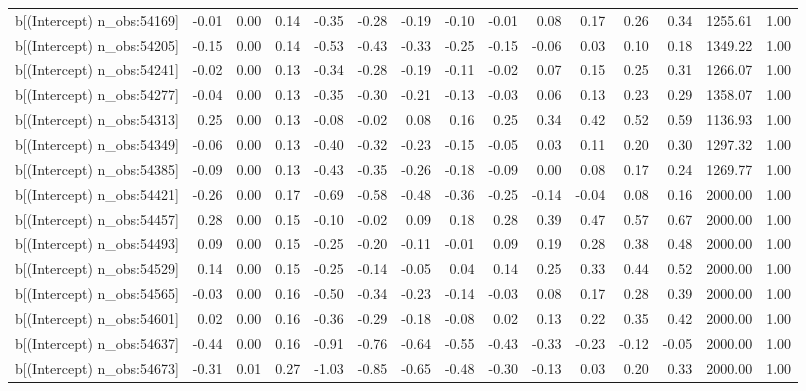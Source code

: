 \begin{table}[ht]
\begin{tabular}{rrrrrrrrrrrrrrr}
  b[(Intercept) n\_obs:54169] & -0.01 & 0.00 & 0.14 & -0.35 & -0.28 & -0.19 & -0.10 & -0.01 & 0.08 & 0.17 & 0.26 & 0.34 & 1255.61 & 1.00 \\ 
  b[(Intercept) n\_obs:54205] & -0.15 & 0.00 & 0.14 & -0.53 & -0.43 & -0.33 & -0.25 & -0.15 & -0.06 & 0.03 & 0.10 & 0.18 & 1349.22 & 1.00 \\ 
  b[(Intercept) n\_obs:54241] & -0.02 & 0.00 & 0.13 & -0.34 & -0.28 & -0.19 & -0.11 & -0.02 & 0.07 & 0.15 & 0.25 & 0.31 & 1266.07 & 1.00 \\ 
  b[(Intercept) n\_obs:54277] & -0.04 & 0.00 & 0.13 & -0.35 & -0.30 & -0.21 & -0.13 & -0.03 & 0.06 & 0.13 & 0.23 & 0.29 & 1358.07 & 1.00 \\ 
  b[(Intercept) n\_obs:54313] & 0.25 & 0.00 & 0.13 & -0.08 & -0.02 & 0.08 & 0.16 & 0.25 & 0.34 & 0.42 & 0.52 & 0.59 & 1136.93 & 1.00 \\ 
  b[(Intercept) n\_obs:54349] & -0.06 & 0.00 & 0.13 & -0.40 & -0.32 & -0.23 & -0.15 & -0.05 & 0.03 & 0.11 & 0.20 & 0.30 & 1297.32 & 1.00 \\ 
  b[(Intercept) n\_obs:54385] & -0.09 & 0.00 & 0.13 & -0.43 & -0.35 & -0.26 & -0.18 & -0.09 & 0.00 & 0.08 & 0.17 & 0.24 & 1269.77 & 1.00 \\ 
  b[(Intercept) n\_obs:54421] & -0.26 & 0.00 & 0.17 & -0.69 & -0.58 & -0.48 & -0.36 & -0.25 & -0.14 & -0.04 & 0.08 & 0.16 & 2000.00 & 1.00 \\ 
  b[(Intercept) n\_obs:54457] & 0.28 & 0.00 & 0.15 & -0.10 & -0.02 & 0.09 & 0.18 & 0.28 & 0.39 & 0.47 & 0.57 & 0.67 & 2000.00 & 1.00 \\ 
  b[(Intercept) n\_obs:54493] & 0.09 & 0.00 & 0.15 & -0.25 & -0.20 & -0.11 & -0.01 & 0.09 & 0.19 & 0.28 & 0.38 & 0.48 & 2000.00 & 1.00 \\ 
  b[(Intercept) n\_obs:54529] & 0.14 & 0.00 & 0.15 & -0.25 & -0.14 & -0.05 & 0.04 & 0.14 & 0.25 & 0.33 & 0.44 & 0.52 & 2000.00 & 1.00 \\ 
  b[(Intercept) n\_obs:54565] & -0.03 & 0.00 & 0.16 & -0.50 & -0.34 & -0.23 & -0.14 & -0.03 & 0.08 & 0.17 & 0.28 & 0.39 & 2000.00 & 1.00 \\ 
  b[(Intercept) n\_obs:54601] & 0.02 & 0.00 & 0.16 & -0.36 & -0.29 & -0.18 & -0.08 & 0.02 & 0.13 & 0.22 & 0.35 & 0.42 & 2000.00 & 1.00 \\ 
  b[(Intercept) n\_obs:54637] & -0.44 & 0.00 & 0.16 & -0.91 & -0.76 & -0.64 & -0.55 & -0.43 & -0.33 & -0.23 & -0.12 & -0.05 & 2000.00 & 1.00 \\ 
  b[(Intercept) n\_obs:54673] & -0.31 & 0.01 & 0.27 & -1.03 & -0.85 & -0.65 & -0.48 & -0.30 & -0.13 & 0.03 & 0.20 & 0.33 & 2000.00 & 1.00 \\ 

\end{tabular}
\end{table}
